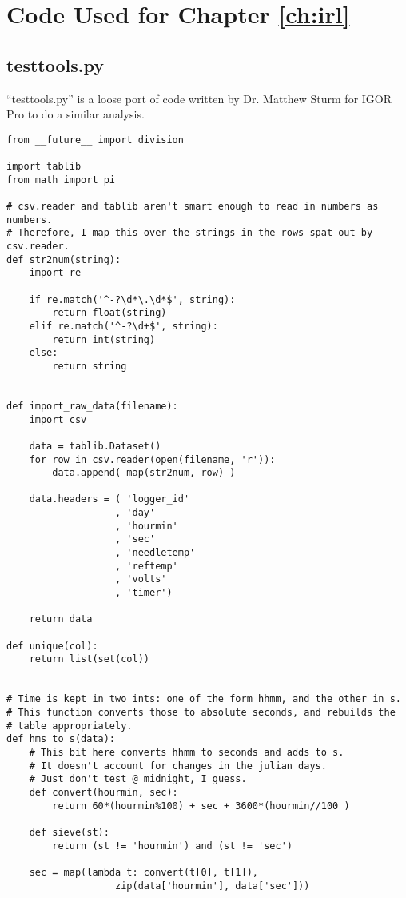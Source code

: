 \chapter{Code Used for Chapter \ref{ch:irl}}
\label{apx:irl}

\section{testtools.py}

``testtools.py'' is a loose port of code written by Dr. Matthew Sturm for
IGOR Pro to do a similar analysis.

\small
\begin{verbatim}
from __future__ import division

import tablib
from math import pi

# csv.reader and tablib aren't smart enough to read in numbers as numbers.
# Therefore, I map this over the strings in the rows spat out by csv.reader.
def str2num(string):
    import re

    if re.match('^-?\d*\.\d*$', string):
        return float(string)
    elif re.match('^-?\d+$', string):
        return int(string)
    else:
        return string


def import_raw_data(filename):
    import csv

    data = tablib.Dataset()
    for row in csv.reader(open(filename, 'r')):
        data.append( map(str2num, row) )

    data.headers = ( 'logger_id'
                   , 'day'
                   , 'hourmin'
                   , 'sec'
                   , 'needletemp'
                   , 'reftemp'
                   , 'volts'
                   , 'timer')

    return data

def unique(col):
    return list(set(col))


# Time is kept in two ints: one of the form hhmm, and the other in s.
# This function converts those to absolute seconds, and rebuilds the
# table appropriately.
def hms_to_s(data):
    # This bit here converts hhmm to seconds and adds to s.
    # It doesn't account for changes in the julian days.
    # Just don't test @ midnight, I guess.
    def convert(hourmin, sec):
        return 60*(hourmin%100) + sec + 3600*(hourmin//100 )

    def sieve(st):
        return (st != 'hourmin') and (st != 'sec')

    sec = map(lambda t: convert(t[0], t[1]), 
                   zip(data['hourmin'], data['sec']))


\end{verbatim}
